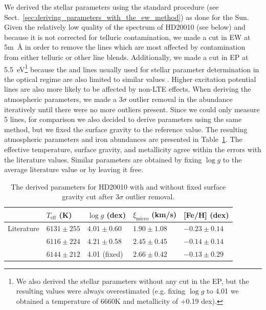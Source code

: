 \documentclass{aa}
\begin{document}
We derived the stellar parameters using the standard procedure (see
Sect.~\ref{sec:deriving_parameters_with_the_ew_method}) as done for
the Sun. Given the relatively low quality of the spectrum of HD20010
(see below) and because  it is not corrected for telluric
contamination, we made a cut in EW at 5\si{m\angstrom} in order to
remove the lines which are most affected by contamination from either
telluric or other line blends. Additionally, we made a cut in EP at
\SI{5.5}{eV}\footnote{We also derived the stellar parameters without
any cut in the EP, but the resulting values were always overestimated
(e.g. fixing $\log g$ to 4.01 we obtained a temperature of 6660K and
metallicity of +0.19 dex).} because the  and
 lines usually used for stellar parameter determination
in the optical regime are also limited to similar values \citep[see
e.g.][]{Sousa2008a}. Higher excitation potential lines are also more
likely to be affected by non-LTE effects. When deriving the atmospheric
parameters, we made a $3\sigma$ outlier removal in the abundance
iteratively until there were no more outliers present. Since we could
only measure 5  lines, for comparison we also decided to
derive parameters using the same method, but we fixed the surface gravity
to the reference value. The resulting atmospheric parameters
and iron abundances are presented in Table~\ref{tab:hd20010}. The
effective temperature, surface gravity, and metallicity agree within the
errors with the literature values. Similar parameters are obtained by
fixing $\log g$ to the average literature value or by leaving it free.

\begin{table}[htb!]
    \caption{The derived parameters for HD20010 with and without
    fixed surface gravity cut after 3$\sigma$ outlier removal.}
    \label{tab:hd20010}
    \centering
    \begin{tabular}{lllll}
      \hline\hline
                     & $T_\mathrm{eff}$ (K) &  $\log g$ (dex)  &   $\xi_\mathrm{micro}$ (km/s)  & [Fe/H] (dex)      \\
      \hline
        Literature   & $6131 \pm 255$       &  $4.01 \pm 0.60$ &    $1.90 \pm 1.08$              & $-0.23 \pm 0.14$ \\
      \hline
                     & $6116 \pm 224$       &  $4.21 \pm 0.58$ &    $2.45 \pm 0.45$              & $-0.14 \pm 0.14$ \\
                     & $6144 \pm 212$       &   4.01 (fixed)   &    $2.66 \pm 0.42$              & $-0.13 \pm 0.29$ \\
      \hline
    \end{tabular}
\end{table}
\end{document}
